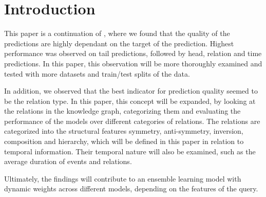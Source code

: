 \section{Introduction}
\label{sec:introduction}



This paper is a continuation of \cite{P9}, where we found that the quality of the predictions are highly dependant on the target of the prediction. Highest performance was observed on tail predictions, followed by head, relation and time predictions. In this paper, this observation will be more thoroughly examined and tested with more datasets and train/test splits of the data.

In addition, we observed that the best indicator for prediction quality seemed to be the relation type. In this paper, this concept will be expanded, by looking at the relations in the knowledge graph, categorizing them and evaluating the performance of the models over different categories of relations. The relations are categorized into the structural features symmetry, anti-symmetry, inversion, composition and hierarchy, which will be defined in this paper in relation to temporal information. Their temporal nature will also be examined, such as the average duration of events and relations.

Ultimately, the findings will contribute to an ensemble learning model with dynamic weights across different models, depending on the features of the query.